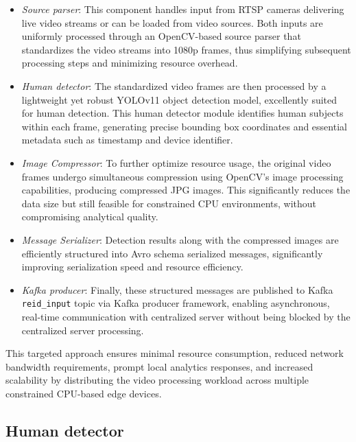 \begin{itemize}
    \item \textit{Source parser}: This component handles input from RTSP cameras delivering live video streams or can be loaded from video sources. Both inputs are uniformly processed through an OpenCV-based source parser that standardizes the video streams into 1080p frames, thus simplifying subsequent processing steps and minimizing resource overhead.
    
    \item \textit{Human detector}: The standardized video frames are then processed by a lightweight yet robust YOLOv11 object detection model, excellently suited for human detection. This human detector module identifies human subjects within each frame, generating precise bounding box coordinates and essential metadata such as timestamp and device identifier.
    
    \item \textit{Image Compressor}: To further optimize resource usage, the original video frames undergo simultaneous compression using OpenCV's image processing capabilities, producing compressed JPG images. This significantly reduces the data size but still feasible for constrained CPU environments, without compromising analytical quality.
    
    \item \textit{Message Serializer}: Detection results along with the compressed images are efficiently structured into Avro schema serialized messages, significantly improving serialization speed and resource efficiency.
    
    \item \textit{Kafka producer}: Finally, these structured messages are published to Kafka \texttt{reid\_input} topic via Kafka producer framework, enabling asynchronous, real-time communication with centralized server without being blocked by the centralized server processing.
\end{itemize}

This targeted approach ensures minimal resource consumption, reduced network bandwidth requirements, prompt local analytics responses, and increased scalability by distributing the video processing workload across multiple constrained CPU-based edge devices.


\subsection{Human detector}
\label{sec:edge_human_detection}

